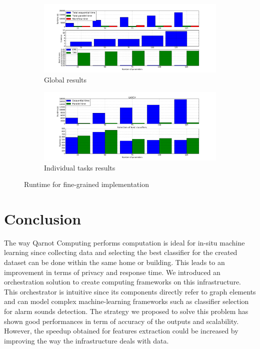 \documentclass[10pt, conference, compsocconf]{IEEEtran}
\begin{document}
\begin{figure}[h]
  \begin{center}
    \begin{subfigure}{0.5\textwidth}
      \centering
      \includegraphics[width=\textwidth]{Figures/times_increasparams_global_bars.png}
      \caption{\footnotesize Global results \label{subfig:scalability_glob}}
  \end{subfigure}
  \begin{subfigure}{0.5\textwidth}
    \centering
    \includegraphics[width=\textwidth]{Figures/times_increasparams_individual_bars.png}
    \caption{\footnotesize Individual tasks results \label{subfig:scalability_ind}}
  \end{subfigure}
\end{center}
\caption{Runtime for fine-grained implementation \label{fig:scalability}}
\end{figure}
\section{Conclusion} \label{Conclusion}
The way Qarnot Computing performs computation is ideal for in-situ machine learning since collecting data and selecting the best classifier for the created dataset can be done within the same home or building. This leads to an improvement in terms of privacy and response time. We introduced an orchestration solution to create computing frameworks on this infrastructure. This orchestrator is intuitive since its components directly refer to graph elements and can model complex machine-learning frameworks such as classifier selection for alarm sounds detection. The strategy we proposed to solve this problem has shown good performances in term of accuracy of the outputs and scalability. However, the speedup obtained for features extraction could be increased by improving the way the infrastructure deals with data. 







\end{document}
